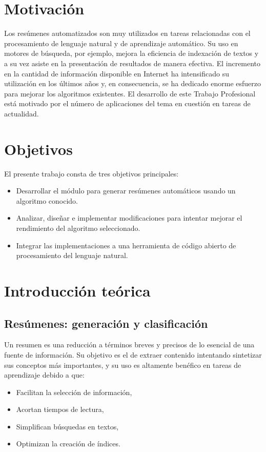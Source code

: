 \documentclass[a4paper]{article}
\begin{document}
\section{Motivación}
Los resúmenes automatizados son muy utilizados en tareas relacionadas con el procesamiento de lenguaje natural y de aprendizaje automático. Su uso en motores de búsqueda, por ejemplo, mejora la eficiencia de indexación de textos y a su vez asiste en la presentación de resultados de manera efectiva. El incremento en la cantidad de información disponible en Internet ha intensificado su utilización en los últimos años y, en consecuencia, se ha dedicado enorme esfuerzo para mejorar los algoritmos existentes. 
El desarrollo de este Trabajo Profesional está motivado por el número de aplicaciones del tema en cuestión en tareas de actualidad.


\section{Objetivos}
El presente trabajo consta de tres objetivos principales:
\begin{itemize}
\item Desarrollar el módulo para generar resúmenes automáticos usando un algoritmo conocido.
\item Analizar, diseñar e implementar modificaciones para intentar mejorar el rendimiento del algoritmo seleccionado.
\item Integrar las implementaciones a una herramienta de código abierto de procesamiento del lenguaje natural.
\end{itemize}

\section{Introducción teórica}

\subsection{Resúmenes: generación y clasificación}
Un resumen es una reducción a términos breves y precisos de lo esencial de una fuente de información. Su objetivo es el de extraer contenido intentando sintetizar sus conceptos más importantes, y su uso es altamente benéfico en tareas de aprendizaje debido a que:
\begin{itemize}
\item Facilitan la selección de información,
\item Acortan tiempos de lectura,
\item Simplifican búsquedas en textos,
\item Optimizan la creación de índices.
\end{itemize}
\end{document}
